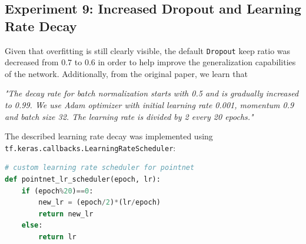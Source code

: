 \documentclass[11pt,a4paper]{article}
\begin{document}
\subsection{Experiment 9: Increased Dropout and Learning Rate Decay}
Given that overfitting is still clearly visible, the default \texttt{Dropout} keep ratio was decreased from $0.7$ to $0.6$ in order to help improve the generalization capabilities of the network. Additionally, from the original paper, we learn that
\begin{displayquote}
\textit{"The decay rate for batch normalization starts with 0.5 and is gradually increased to 0.99. We use Adam optimizer with initial learning rate 0.001, momentum 0.9 and batch size 32. The learning rate is divided by 2 every 20 epochs."}
\end{displayquote}
The described learning rate decay was implemented using\\ \texttt{tf.keras.callbacks.LearningRateScheduler}:
\begin{lstlisting}[language=Python,frame=single]
# custom learning rate scheduler for pointnet
def pointnet_lr_scheduler(epoch, lr):
    if (epoch%20)==0:
        new_lr = (epoch/2)*(lr/epoch)
        return new_lr
    else:
        return lr
\end{lstlisting}
\end{document}
